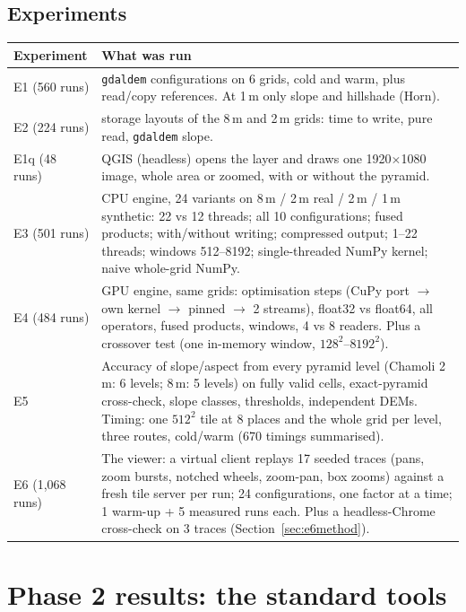 ﻿\documentclass[11pt,a4paper]{article}
\newcommand{\code}[1]{\texttt{#1}}
\begin{document}
\subsection{Experiments}
\begin{longtable}{>{\raggedright\arraybackslash}p{2.4cm}>{\raggedright\arraybackslash}p{13.0cm}}
\toprule
Experiment & What was run \\
\midrule
\endhead
E1 (560 runs) & 10 \code{gdaldem} configurations on 6 grids, cold and warm, plus read/copy references. At 1\,m only slope and
hillshade (Horn). \\
E2 (224 runs) & 7 storage layouts of the 8\,m and 2\,m grids: time to write, pure read, \code{gdaldem} slope. \\
E1q (48 runs) & QGIS (headless) opens the layer and draws one 1920$\times$1080 image, whole area or zoomed, with or without
the pyramid. \\
E3 (501 runs) & CPU engine, 24 variants on 8\,m / 2\,m real / 2\,m / 1\,m synthetic: 22 vs 12 threads; all 10 configurations;
fused products; with/without writing; compressed output; 1--22 threads; windows 512--8192; single-threaded NumPy kernel;
naive whole-grid NumPy. \\
E4 (484 runs) & GPU engine, same grids: optimisation steps (CuPy port $\to$ own kernel $\to$ pinned $\to$ 2 streams), float32
vs float64, all operators, fused products, windows, 4 vs 8 readers. Plus a crossover test (one in-memory window,
$128^2$--$8192^2$). \\
E5 & Accuracy of slope/aspect from every pyramid level (Chamoli 2\,m: 6 levels; 8\,m: 5 levels) on fully valid cells,
exact-pyramid cross-check, slope classes, thresholds, independent DEMs. Timing: one $512^2$ tile at 8 places and the
whole grid per level, three routes, cold/warm (670 timings summarised). \\
E6 (1{,}068 runs) & The viewer: a virtual client replays 17 seeded traces (pans, zoom bursts, notched wheels, zoom-pan,
box zooms) against a fresh tile server per run; 24 configurations, one factor at a time; 1 warm-up + 5 measured runs
each. Plus a headless-Chrome cross-check on 3 traces (Section~\ref{sec:e6method}). \\
\bottomrule
\end{longtable}

\section{Phase 2 results: the standard tools}
\end{document}
